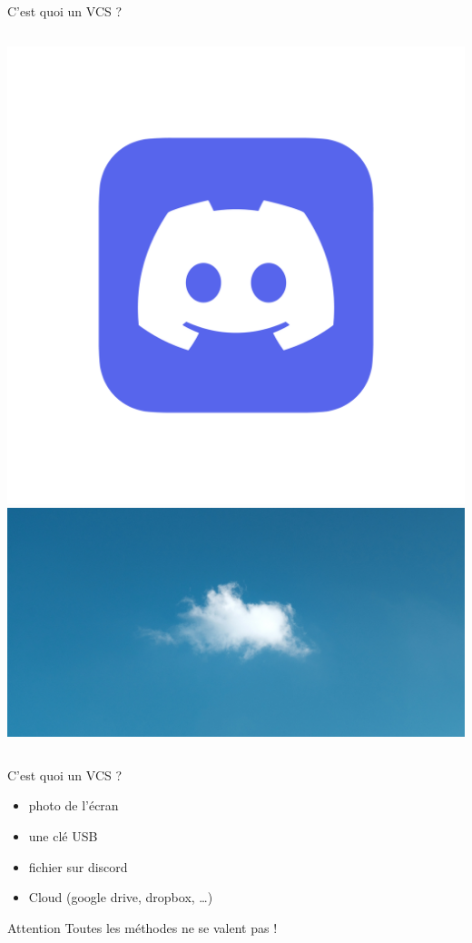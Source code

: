 \documentclass[usenames,dvipsnames]{beamer}
\begin{document}
\begin{frame}[fragile]{C'est quoi un VCS ?}
\begin{columns}
\begin{column}{0.5\linewidth}
\begin{overprint}
				\includegraphics[width=\linewidth]{Im/discord.png}
				\onslide<4>\includegraphics[width=\linewidth]{Im/cumulus.jpg}
			\end{overprint}
		\end{column}
	\end{columns}
\end{frame}

\begin{frame}[fragile]{C'est quoi un VCS ?}
	\begin{itemize}
		\item photo de l'écran
		\item une clé USB
		\item fichier sur discord
		\item Cloud (google drive, dropbox, \dots)
	\end{itemize}
	\begin{alertblock}{Attention}
		Toutes les méthodes ne se valent pas !
	\end{alertblock}
\end{frame}
\end{document}
